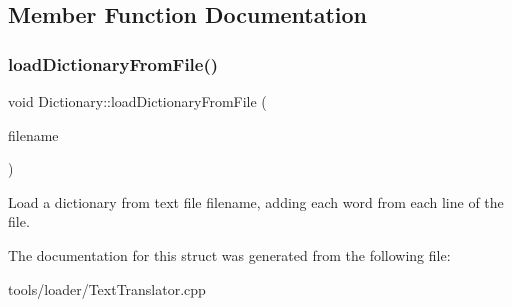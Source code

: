 \subsection{Member Function Documentation}
\mbox{\label{struct_dictionary_ab13706e0db58647f40c38bf4c56cd213}} 
\subsubsection{\texorpdfstring{load\+Dictionary\+From\+File()}{loadDictionaryFromFile()}}
{\footnotesize\ttfamily void Dictionary\+::load\+Dictionary\+From\+File (\begin{DoxyParamCaption}\item[{llvm\+::\+String\+Ref}]{filename }\end{DoxyParamCaption})\hspace{0.3cm}{\ttfamily [inline]}}

Load a dictionary from text file {\ttfamily filename}, adding each word from each line of the file. 

The documentation for this struct was generated from the following file\+:\begin{DoxyCompactItemize}
\item 
tools/loader/Text\+Translator.\+cpp\end{DoxyCompactItemize}
